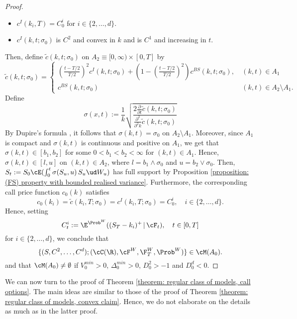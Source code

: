 \documentclass[11pt]{article}
\begin{document}
\begin{proof}
\begin{itemize}
\item $c^{I}(k_i, T) = C^i_0$ for $i \in \{2, \ldots, d\}$.
\item $c^{I}(k,t; \sigma_0)$ is $C^2$ and convex in $k$ and is $C^1$ and increasing in $t$.
\end{itemize}
Then, define $\widetilde{c}(k,t; \sigma_0)$ on $A_2 \equiv [0, \infty) \times [0,T]$ by
$$
\widetilde{c}(k, t; \sigma_0) =
\begin{cases}
\left(\frac{t-T/2}{T/2} \right)^2 c^{I}(k, t; \sigma_0) + \left(1 - \left(\frac{t-T/2}{T/2} \right)^2 \right) c^{BS}(k, t; \sigma_0), \ & (k,t) \in A_1 \\
c^{BS}(k, t; \sigma_0) & (k,t) \in A_2 \setminus A_1.
\end{cases}
$$
Define
$$
\sigma(x,t) := \frac{1}{k} \sqrt{\frac{2 \frac{\partial}{\partial t} \widetilde{c}(k, t; \sigma_0)}{\frac{\partial^2}{\partial^2 k} \widetilde{c}(k, t; \sigma_0)}}
$$
By Dupire's formula \cite{Dupire:local-vol}, it follows that $\sigma(k,t) = \sigma_0$ on $A_2 \setminus A_1$. Moreover, since $A_1$ is compact and $\sigma(k,t)$ is continuous and positive on $A_1$, we get that $\sigma(k,t) \in [b_1, b_2]$ for some $0 < b_1 < b_2 < \infty$ for $(k,t) \in A_1$. Hence, $\sigma(k,t) \in [l,u]$ on $(k,t) \in A_2$, where $l = b_1 \wedge \sigma_0$ and $u = b_2 \vee \sigma_0$. Then, $S_t := S_0 \cE( \int_0^t \sigma( S_u, u) \, S_u \ud W_u)$ has full support by Proposition \ref{proposition: (FS) property with bounded realised variance}. Furthermore, the corresponding call price function $c_0(k)$ satisfies 
$$
c_0(k_i) = \widetilde{c}(k_i, T; \sigma_0) = c^{I}(k_i, T; \sigma_0) = C^i_0, \quad i \in \{2, \ldots, d\}.
$$
Hence, setting
$$
C^i_t := \E^{\Prob^W}( (S_T - k_i)^+ \, | \, \cF_t), \quad t \in [0,T]
$$
for $i \in \{2,\ldots,d\}$, we conclude that 
$$
\{ (S, C^2,\ldots,C^d); (\cC(\R), \cF^W, \F^W_T, \Prob^W) \} \in \cM(A_0).
$$
and that $\cM(A_0) \neq \emptyset$ if $V^{min}_0 > 0$, $\Delta^{min}_0 > 0$, $D^2_0 > -1$ and $D^d_0 < 0$.

\end{proof}

We can now turn to the proof of Theorem \ref{theorem: regular class of models, call options}. The main ideas are similar to those of the proof of Theorem \ref{theorem: regular class of models, convex claim}. Hence, we do not elaborate on the details as much as in the latter proof.
\end{document}
